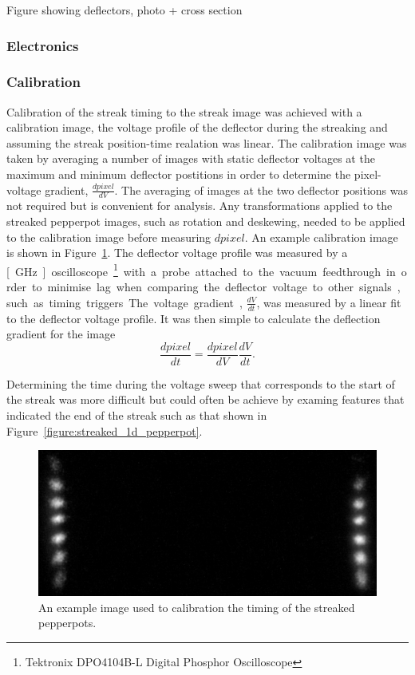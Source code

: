 {\color{red}Figure showing deflectors, photo + cross section}

\subsubsection{Electronics}

\subsubsection{Calibration}
Calibration of the streak timing to the streak image was achieved with a calibration image, the voltage profile of the deflector during the streaking and assuming the streak position-time realation was linear.
The calibration image was taken by averaging a number of images with static deflector voltages at the maximum and minimum deflector postitions in order to determine the pixel-voltage gradient, $\frac{dpixel}{dV}$.
The averaging of images at the two deflector positions was not required but is convenient for analysis.
Any transformations applied to the streaked pepperpot images, such as rotation and deskewing, needed to be applied to the calibration image before measuring $dpixel$.
An example calibration image is shown in Figure~\ref{figure:example_calibration}.
The deflector voltage profile was measured by a \unit[1][GHz] oscilloscope\footnote{Tektronix DPO4104B-L Digital Phosphor Oscilloscope} with a probe attached to the vacuum feedthrough in order to minimise lag when comparing the deflector voltage to other signals, such as timing triggers.
The voltage gradient, $\frac{dV}{dt}$, was measured by a linear fit to the deflector voltage profile.
It was then simple to calculate the  deflection gradient for the image
\begin{equation}
\frac{dpixel}{dt} = \frac{dpixel}{dV} \frac{dV}{dt}.
\end{equation}

Determining the time during the voltage sweep that corresponds to the start of the streak was more difficult but could often be achieve by examing features that indicated the end of the streak such as that shown in Figure~\ref{figure:streaked_1d_pepperpot}.

\begin{figure}
    \center
    \includegraphics[width=0.5\linewidth]{part2/Figs/example_calibration.jpeg}
    \caption{An example image used to calibration the timing of the streaked pepperpots.}
    \label{figure:example_calibration}
\end{figure}


